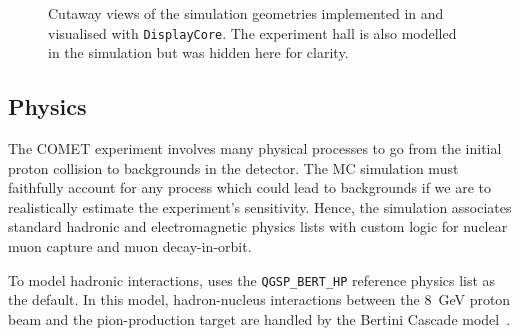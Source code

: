 \begin{figure}
    \caption{Cutaway views of the simulation geometries implemented in \SimG and visualised with \texttt{DisplayCore}. The experiment hall is also modelled in the simulation but was hidden here for clarity.}
    \label{fig:comet_geometries}
\end{figure}




\subsection{Physics}
The COMET experiment involves many physical processes to go from the initial proton collision to backgrounds in the detector.
The MC simulation must faithfully account for any process which could lead to backgrounds if we are to realistically estimate the experiment's sensitivity. 
Hence, the \SimG simulation associates standard \Geant hadronic and electromagnetic physics lists with custom logic for nuclear muon capture and muon decay-in-orbit.

To model hadronic interactions, \SimG uses the \texttt{QGSP\_BERT\_HP} reference physics list as the default. In this model, hadron-nucleus interactions between the \SI{8}{\GeV} proton beam and the pion-production target are handled by the Bertini Cascade model~\cite{WRIGHT2015175}.

